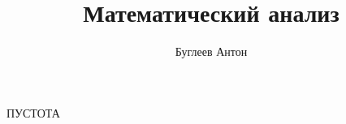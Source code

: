 \documentclass[a4paper, 14pt]{article}
\title{Математический анализ}
\author{Буглеев Антон}
\date{}
\begin{document}
    \maketitle
    \newpage
    
    ПУСТОТА
\end{document}

